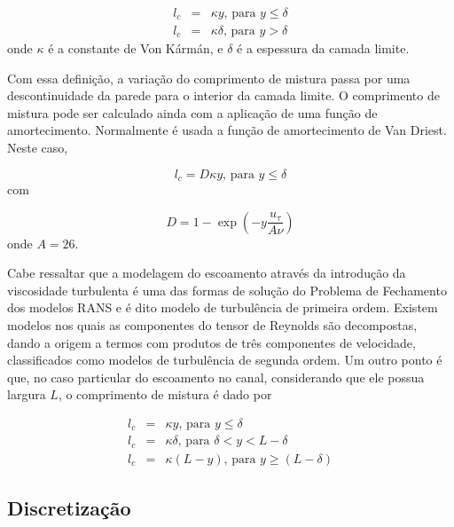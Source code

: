 \documentclass[a4paper,portuguese,10pt]{article}
\begin{document}
\begin{subequations}
  \begin{eqnarray}
    l_c&=&\kappa y\text{, para }y\leq\delta\\
    l_c&=&\kappa \delta\text{, para }y>\delta
  \end{eqnarray}
\end{subequations}
onde $\kappa$ é a constante de Von Kármán, e $\delta$ é a espessura da camada limite.

Com essa definição, a variação do comprimento de mistura passa por uma descontinuidade da parede para o interior da camada limite. O comprimento de mistura pode ser calculado ainda com a aplicação de uma função de amortecimento. Normalmente é usada a função de amortecimento de Van Driest. Neste caso,

\begin{equation}
  l_c=D\kappa y\text{, para }y\leq\delta
\end{equation}
com

\begin{equation}
  D = 1-\exp\left(-y\frac{u_{\tau}}{A\nu}\right)
\end{equation}
onde $A = 26$.

Cabe ressaltar que a modelagem do escoamento através da introdução da viscosidade turbulenta é uma das formas de solução do Problema de Fechamento dos modelos RANS e é dito modelo de turbulência de primeira ordem. Existem modelos nos quais as componentes do tensor de Reynolds são decompostas, dando a origem a termos com produtos de três componentes de velocidade, classificados como modelos de turbulência de segunda ordem. Um outro ponto é que, no caso particular do escoamento no canal, considerando que ele possua largura $L$, o comprimento de mistura é dado por

\begin{subequations}
  \begin{eqnarray}
    l_c &=& \kappa y\text{, para }y\leq\delta\\
    l_c &=& \kappa \delta\text{, para }\delta<y<L-\delta\\
    l_c &=& \kappa(L-y)\text{, para }y\geq(L-\delta)
  \end{eqnarray}
\end{subequations}

\subsection{Discretização}
\end{document}
